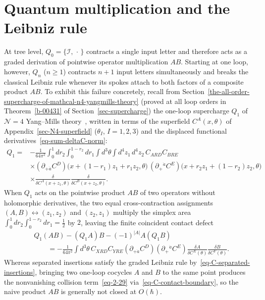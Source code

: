 \documentclass[11pt]{article}
\numberwithin{equation}{section}
\numberwithin{figure}{section}
\numberwithin{table}{section}
\begin{document}
\section{Quantum multiplication and the Leibniz rule}\label{sec-product}

At tree level, $Q_0=\{\mathcal I,\,\cdot\,\}$ contracts a single input letter and therefore acts as a graded derivation of pointwise operator multiplication $AB$. Starting at one loop, however, $Q_n$ ($n\ge1$) contracts $n+1$ input letters simultaneously and breaks the classical Leibniz rule whenever its spokes attach to both factors of a composite product $AB$. To exhibit this failure concretely, recall from Section~\ref{the-all-order-supercharge-of-mathcal-n4-yangmills-theory} (proved at all loop orders in Theorem~\ref{b-00431} of Section~\ref{sec-supercharge}) the one-loop supercharge $Q_1$ of $\mathcal N=4$ Yang--Mills theory~\cite{BK}, written in terms of the superfield $C^A(x,\theta)$ of Appendix~\ref{sec-N4-superfield} ($\theta_I$, $I=1,2,3$) and the displaced functional derivatives~\eqref{eq-sum-deltaC-norm}:
\begin{equation}\label{eq-2-16}
\begin{aligned}
Q_1={}&-\frac{1}{64\pi^2}
\int_0^1dr_2\int_0^{1-r_2}dr_1\int d^3\theta\int d^4z_1\,d^4z_2\,
C_{ARD}C_{BRE}\\
&\times(\partial_{+\dot a}C^D)
\big(x+(1-r_1)z_1+r_1z_2,\theta\big)\,
(\partial_+{}^{\dot a}C^E)
\big(x+r_2z_1+(1-r_2)z_2,\theta\big)\\
&\times\frac{\delta}{\delta C^A(x+z_1,\theta)}
\frac{\delta}{\delta C^B(x+z_2,\theta)}.
\end{aligned}
\end{equation}
When $Q_1$ acts on the pointwise product $AB$ of two operators without holomorphic derivatives, the two equal cross-contraction assignments $(A,B)\leftrightarrow(z_1,z_2)$ and $(z_2,z_1)$ multiply the simplex area $\int_0^1dr_2\int_0^{1-r_2}dr_1=\tfrac12$ by $2$, leaving the finite coincident contact defect
\begin{equation}\label{eq-2-29}
\begin{aligned}
&Q_1(AB)-(Q_1A)B-(-1)^{|A|}A(Q_1B)\\
&\qquad=-\frac1{64\pi^2}\int d^3\theta\,
C_{XRD}C_{YRE}
(\partial_{+\dot a}C^D)(\partial_+{}^{\dot a}C^E)
\frac{\delta A}{\delta C^X(\theta)}\frac{\delta B}{\delta C^Y(\theta)}.
\end{aligned}
\end{equation}
Whereas separated insertions satisfy the graded Leibniz rule by~\eqref{eq-C-separated-insertions}, bringing two one-loop cocycles $A$ and $B$ to the same point produces the nonvanishing collision term~\eqref{eq-2-29} via~\eqref{eq-C-contact-boundary}, so the naive product $AB$ is generally not closed at $O(\hbar)$.
\end{document}
